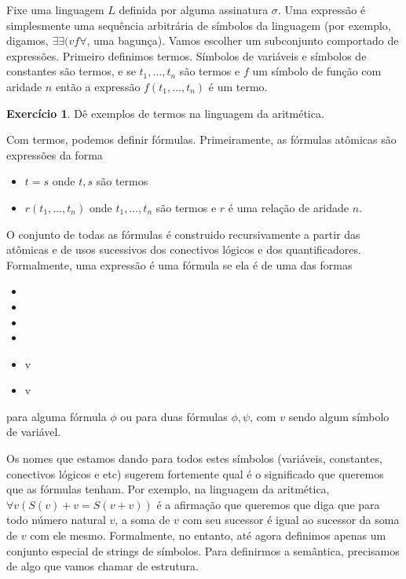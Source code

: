 \documentclass[11pt]{article}
\renewcommand{\textbf}[1]{{\fakebold#1}}
\newcommand{\luafacil}{
\emoji{waxing-crescent-moon}
}
\theoremstyle{definition}
\theoremstyle{definition}
\theoremstyle{definition}
\theoremstyle{definition}
\theoremstyle{definition}
\theoremstyle{definition}
\theoremstyle{definition}
\theoremstyle{definition}
\newtheorem*{definition*}{Definição}
\newenvironment{definicao*}{
\definecolor{shadecolor}{HTML}{defcfc}
\begin{shaded}
\begin{definition*}
}
{
\end{definition*}
\end{shaded}
}
\theoremstyle{definition}
\theoremstyle{definition}
\theoremstyle{definition}
\theoremstyle{definition}
\theoremstyle{definition}
\newtheorem{exersisio}{Exercício}
\newenvironment{exercicio}{
\definecolor{shadecolor}{HTML}{CFB5FF}
\begin{shaded}
\begin{exersisio}
}
{
\end{exersisio}
\end{shaded}
}
\begin{document}
\begin{definicao*}
Fixe uma linguagem $L$ definida por alguma assinatura $\sigma$. Uma \textbf{expressão} é simplesmente uma sequência arbitrária de símbolos da linguagem (por exemplo, digamos, $\exists \exists ( v f \forall$, uma bagunça). Vamos escolher um subconjunto comportado de expressões. Primeiro definimos \textbf{termos}. Símbolos de variáveis e símbolos de constantes são termos, e se $t_1, \dots, t_n$ são termos e $f$ um símbolo de função com aridade $n$ então a expressão $f(t_1,\dots, t_n)$ é um termo.
\end{definicao*}

\begin{exercicio}
  \luafacil Dê exemplos de termos na linguagem da aritmética.
\end{exercicio}

\begin{definicao*}
Com termos, podemos definir \textbf{fórmulas}. Primeiramente, as \textbf{fórmulas atômicas} são expressões da forma

\begin{itemize}[label=]
  \item $t = s$ onde $t,s$ são termos
  \item $r(t_1, \dots, t_n)$ onde $t_1, \dots, t_n$ são termos e $r$ é uma relação de aridade $n$.
\end{itemize}

O conjunto de todas as fórmulas é construido recursivamente a partir das atômicas e de usos sucessivos dos conectivos lógicos e dos quantificadores. Formalmente, uma expressão é uma fórmula se ela é de uma das formas

\begin{itemize}[label=]
  \item \lnot \phi
  \item \phi \vee \psi
  \item \phi \wedge \psi
  \item \phi \rightarrow \psi
  \item \exists v \phi
  \item \forall v \phi
\end{itemize}

para alguma fórmula $\phi$ ou para duas fórmulas $\phi,\psi$, com $v$ sendo algum símbolo de variável.
\end{definicao*}

Os nomes que estamos dando para todos estes símbolos (variáveis, constantes, conectivos lógicos e etc) sugerem fortemente qual é o significado que queremos que as fórmulas tenham. Por exemplo, na linguagem da aritmética, $\forall v (S(v) + v = S(v + v))$ é a afirmação que queremos que diga que para todo número natural $v$, a soma de $v$ com seu sucessor é igual ao sucessor da soma de $v$ com ele mesmo. Formalmente, no entanto, até agora definimos apenas um conjunto especial de strings de símbolos. Para definirmos a semântica, precisamos de algo que vamos chamar de estrutura.\\
\end{document}
